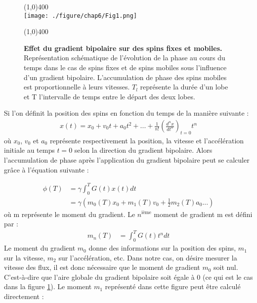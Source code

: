 \begin{figure}[H]
\centering
\line(1,0){400} \\
\texttt{[image: ./figure/chap6/Fig1.png]}
\caption[Effet du gradient bipolaire sur des spins fixes et mobiles.]{\label{fig:PhaseSpins} \textbf{Effet du gradient bipolaire sur des spins fixes et mobiles.} Représentation schématique de l'évolution de la phase au cours du temps dans le cas de spins fixes et de spins mobiles sous l'influence d'un gradient bipolaire. L'accumulation de phase des spins mobiles est proportionnelle à leurs vitesses. $T_l$ représente la durée d'un lobe et T l'intervalle de temps entre le départ des deux lobes. }
\line(1,0){400} \\ 
\end{figure}
Si l'on définit la position des spins en fonction du temps de la manière suivante :
\begin{align}
x(t)=x_0 + v_0 t +a_0 t^2 + ... + \frac{1}{n!} \left(\frac{d^n x}{dt^n}\right)_{t=0} t^n
\end{align}
où $x_0$, $v_0$ et $a_0$ représente respectivement la position, la vitesse et l'accélération initiale au temps $t=0$ selon la direction du gradient bipolaire. Alors l'accumulation de phase après l'application du gradient bipolaire peut se calculer grâce à l'équation suivante :

\begin{align}
\phi (T) &= \gamma \int_0^T G(t) x(t) dt \\
			 &= \gamma (m_0(T) x_0 + m_1(T) v_0 + \frac{1}{2} m_2(T) a_0 ...)
\end{align}
où m représente le moment du gradient. Le $n^{\text{ième}}$ moment de gradient m est défini par :
\begin{align}
m_n (T) &= \int_0^T G(t) t^n dt			
\end{align}
Le moment du gradient $m_0$ donne des informations sur la position des spins, $m_1$ sur la vitesse, $m_2$ sur l'accélération, etc.
Dans notre cas, on désire mesurer la vitesse des flux, il est donc nécessaire que le moment de gradient $m_0$ soit nul. C'est-à-dire que l'aire globale du gradient bipolaire soit égale à 0 (ce qui est le cas dans la figure \ref{fig:PhaseSpins}). Le moment $m_1$ représenté dans cette figure peut être calculé directement :
	
